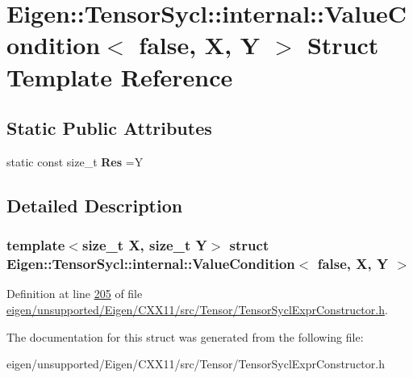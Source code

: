 \hypertarget{struct_eigen_1_1_tensor_sycl_1_1internal_1_1_value_condition_3_01false_00_01_x_00_01_y_01_4}{}\section{Eigen\+:\+:Tensor\+Sycl\+:\+:internal\+:\+:Value\+Condition$<$ false, X, Y $>$ Struct Template Reference}
\label{struct_eigen_1_1_tensor_sycl_1_1internal_1_1_value_condition_3_01false_00_01_x_00_01_y_01_4}
\subsection*{Static Public Attributes}
\begin{DoxyCompactItemize}
\item 
\mbox{\label{struct_eigen_1_1_tensor_sycl_1_1internal_1_1_value_condition_3_01false_00_01_x_00_01_y_01_4_a40296eddee9666aaf3d0b46c33ea4378}} 
static const size\+\_\+t {\bfseries Res} =Y
\end{DoxyCompactItemize}


\subsection{Detailed Description}
\subsubsection*{template$<$size\+\_\+t X, size\+\_\+t Y$>$\newline
struct Eigen\+::\+Tensor\+Sycl\+::internal\+::\+Value\+Condition$<$ false, X, Y $>$}



Definition at line \hyperlink{eigen_2unsupported_2_eigen_2_c_x_x11_2src_2_tensor_2_tensor_sycl_expr_constructor_8h_source_l00205}{205} of file \hyperlink{eigen_2unsupported_2_eigen_2_c_x_x11_2src_2_tensor_2_tensor_sycl_expr_constructor_8h_source}{eigen/unsupported/\+Eigen/\+C\+X\+X11/src/\+Tensor/\+Tensor\+Sycl\+Expr\+Constructor.\+h}.



The documentation for this struct was generated from the following file\+:\begin{DoxyCompactItemize}
\item 
eigen/unsupported/\+Eigen/\+C\+X\+X11/src/\+Tensor/\+Tensor\+Sycl\+Expr\+Constructor.\+h\end{DoxyCompactItemize}
